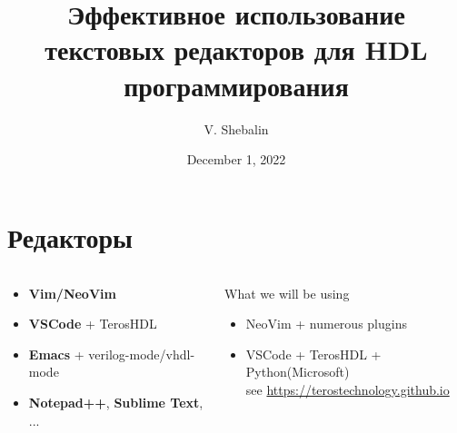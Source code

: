 \documentclass[aspectratio=169]{beamer}
\title[]{\bf Эффективное использование текстовых редакторов для HDL программирования}
\author{V. Shebalin}
\institute{\inst{}
{\textit {}}
}
\date[]{December 1,  2022}
\begin{document}
\frame{\titlepage
}

\footnotesize

\section*{Редакторы}
\begin{frame}{\secname}

  \begin{columns}
    \begin{column}{0.5\textwidth}
  \begin{itemize}
    \item {\bf Vim/NeoVim}
    \item {\bf VSCode} + TerosHDL
    \item {\bf Emacs} + verilog-mode/vhdl-mode
    \item {\bf Notepad++}, {\bf Sublime Text}, ...
  \end{itemize}
      
    \end{column}
    \begin{column}{0.5\textwidth}
  \begin{block}{What we will be using}
    \begin{itemize}
      \item NeoVim + numerous plugins
      \item VSCode + TerosHDL + Python(Microsoft) \\
        see \url{https://terostechnology.github.io}
    \end{itemize}
    
  \end{block}
      
    \end{column}
  \end{columns}

\end{frame}

\end{document}
